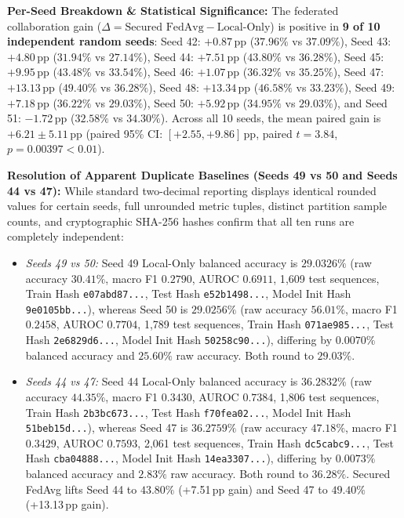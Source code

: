 \documentclass[11pt,a4paper]{report}
\begin{document}
\noindent\textbf{Per-Seed Breakdown \& Statistical Significance:} The federated collaboration gain ($\Delta = \text{Secured FedAvg} - \text{Local-Only}$) is positive in \textbf{9 of 10 independent random seeds}: Seed 42: $+0.87$\,pp ($37.96\%$ vs $37.09\%$), Seed 43: $+4.80$\,pp ($31.94\%$ vs $27.14\%$), Seed 44: $+7.51$\,pp ($43.80\%$ vs $36.28\%$), Seed 45: $+9.95$\,pp ($43.48\%$ vs $33.54\%$), Seed 46: $+1.07$\,pp ($36.32\%$ vs $35.25\%$), Seed 47: $+13.13$\,pp ($49.40\%$ vs $36.28\%$), Seed 48: $+13.34$\,pp ($46.58\%$ vs $33.23\%$), Seed 49: $+7.18$\,pp ($36.22\%$ vs $29.03\%$), Seed 50: $+5.92$\,pp ($34.95\%$ vs $29.03\%$), and Seed 51: $-1.72$\,pp ($32.58\%$ vs $34.30\%$). Across all 10 seeds, the mean paired gain is $\mathbf{+6.21 \pm 5.11}$\,pp (paired 95\% CI: $[+2.55, +9.86]$\,pp, paired $t = 3.84$, $p = 0.00397 < 0.01$).

\noindent\textbf{Resolution of Apparent Duplicate Baselines (Seeds 49 vs 50 and Seeds 44 vs 47):} While standard two-decimal reporting displays identical rounded values for certain seeds, full unrounded metric tuples, distinct partition sample counts, and cryptographic SHA-256 hashes confirm that all ten runs are completely independent:
\begin{itemize}[itemsep=1pt]
  \item \textit{Seeds 49 vs 50:} Seed 49 Local-Only balanced accuracy is $29.0326\%$ (raw accuracy $30.41\%$, macro F1 $0.2790$, AUROC $0.6911$, 1{,}609 test sequences, Train Hash \texttt{e07abd87...}, Test Hash \texttt{e52b1498...}, Model Init Hash \texttt{9e0105bb...}), whereas Seed 50 is $29.0256\%$ (raw accuracy $56.01\%$, macro F1 $0.2458$, AUROC $0.7704$, 1{,}789 test sequences, Train Hash \texttt{071ae985...}, Test Hash \texttt{2e6829d6...}, Model Init Hash \texttt{50258c90...}), differing by $0.0070\%$ balanced accuracy and $25.60\%$ raw accuracy. Both round to $29.03\%$.
  \item \textit{Seeds 44 vs 47:} Seed 44 Local-Only balanced accuracy is $36.2832\%$ (raw accuracy $44.35\%$, macro F1 $0.3430$, AUROC $0.7384$, 1{,}806 test sequences, Train Hash \texttt{2b3bc673...}, Test Hash \texttt{f70fea02...}, Model Init Hash \texttt{51beb15d...}), whereas Seed 47 is $36.2759\%$ (raw accuracy $47.18\%$, macro F1 $0.3429$, AUROC $0.7593$, 2{,}061 test sequences, Train Hash \texttt{dc5cabc9...}, Test Hash \texttt{cba04888...}, Model Init Hash \texttt{14ea3307...}), differing by $0.0073\%$ balanced accuracy and $2.83\%$ raw accuracy. Both round to $36.28\%$. Secured FedAvg lifts Seed 44 to $43.80\%$ (+7.51\,pp gain) and Seed 47 to $49.40\%$ (+13.13\,pp gain).
\end{itemize}
\end{document}
